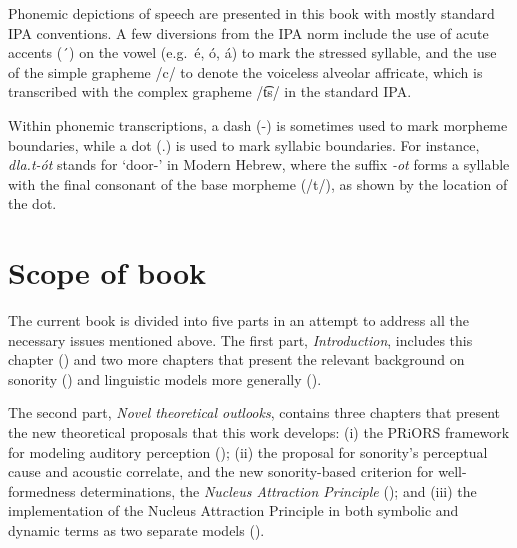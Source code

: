 Phonemic depictions of speech are presented in this book with mostly standard IPA conventions. A few diversions from the IPA norm include the use of acute accents (´) on the vowel (e.g.~é, ó, á) to mark the stressed syllable, and the use of the simple grapheme /c/ to denote the voiceless alveolar affricate, which is transcribed with the complex grapheme /t͡s/ in the standard IPA.

Within phonemic transcriptions, a dash (-) is sometimes used to mark morpheme boundaries, while a dot (.) is used to mark syllabic boundaries. For instance, \emph{dla.t-ót} stands for `door-\Pl{}' in Modern Hebrew, where the suffix \emph{-ot} forms a syllable with the final consonant of the base morpheme (/t/), as shown by the
location of the dot.

%	

\section{Scope of book}\label{scope-of-book}

The current book is divided into five parts in an attempt to address all the necessary issues mentioned above. The first part, \emph{Introduction}, includes this chapter () and two more chapters that present the relevant background on sonority () and linguistic models more generally ().

The second part, \emph{Novel theoretical outlooks}, contains three chapters that present the new theoretical proposals that this work develops:
(i) the PRiORS framework for modeling auditory perception ();
(ii) the proposal for sonority's perceptual cause and acoustic correlate, and the new sonority-based criterion for well-formedness determinations, the \emph{Nucleus Attraction Principle} (); and
(iii) the implementation of the Nucleus Attraction Principle in both symbolic and dynamic terms as two separate models ().

